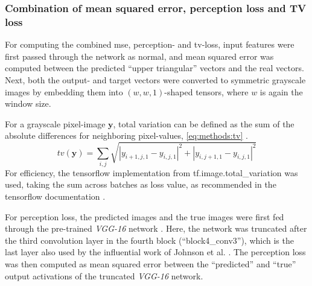 \subsubsection{Combination of mean squared error, perception loss and TV loss} \label{sec:methods:combined_loss}
For computing the combined \acrshort{mse}, perception- and \acrshort{tv}-loss,
input features were first passed through the network as normal,
and mean squared error was computed between the predicted ``upper triangular'' vectors and the real vectors.
Next, both the output- and target vectors were converted to symmetric grayscale images by embedding them into 
$(w, w, 1)$-shaped tensors, where $w$ is again the window size.

For a grayscale pixel-image $\mathbf{y}$, total variation can be defined as the sum of the absolute differences for neighboring pixel-values, \cref{eq:methods:tv} \cite{Rudin1992, wikiTV2021}.
\begin{equation}
 tv(\mathbf{y}) = \sum_{i,j}\sqrt{|y_{i+1,j,1} - y_{i,j,1}|^2 + |y_{i,j+1,1} - y_{i,j,1} |^2 } \label{eq:methods:tv}
\end{equation}
For efficiency, the tensorflow implementation from tf.image.total\_variation was used,
taking the sum across batches as loss value, as recommended in the tensorflow documentation \cite{TensorflowTV2020}.

For perception loss, the predicted images and the true images were first fed through the pre-trained \emph{VGG-16} network \cite{Simonyan2015}.
Here, the network was truncated after the third convolution layer in the fourth block (``block4\_conv3''), which is the last layer also used by the influential work of Johnson et al. \cite{Johnson2016}.
The perception loss was then computed as mean squared error between the ``predicted'' and ``true'' output activations of the truncated \emph{VGG-16} network.

